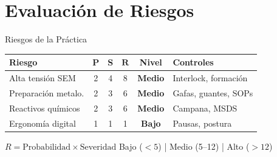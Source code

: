 \documentclass[aspectratio=169,12pt]{beamer}
\begin{document}
\section{Evaluación de Riesgos}

\begin{frame}{Riesgos de la Práctica}
	\centering\small
	\begin{tabular}{>{\raggedright\arraybackslash}p{3.2cm}
		c c c c l}
		\toprule
		\textbf{Riesgo} & \textbf{P}                             & \textbf{S}
		                & $\boldsymbol{R}$                       & \textbf{Nivel}
		                & \textbf{Controles}                                          \\
		\midrule
		\rowcolor{aeroyellow!15}
		Alta tensión SEM
		                & 2                                      & 4              & 8
		                & \textcolor{aeroyellow}{\textbf{Medio}}
		                & Interlock, formación                                        \\
		\rowcolor{aeroyellow!15}
		Preparación metalo.
		                & 2                                      & 3              & 6
		                & \textcolor{aeroyellow}{\textbf{Medio}}
		                & Gafas, guantes, SOPs                                        \\
		\rowcolor{aeroyellow!15}
		Reactivos químicos
		                & 2                                      & 3              & 6
		                & \textcolor{aeroyellow}{\textbf{Medio}}
		                & Campana, MSDS                                               \\
		\rowcolor{aerogreen!15}
		Ergonomía digital
		                & 1                                      & 1              & 1
		                & \textcolor{aerogreen}{\textbf{Bajo}}
		                & Pausas, postura                                             \\
		\bottomrule
	\end{tabular}

	\vspace{0.4em}
	\begin{block}{$R = \text{Probabilidad} \times \text{Severidad}$}
		Bajo ($<5$) \quad | \quad Medio (5--12)
		\quad | \quad Alto ($>12$)
	\end{block}
\end{frame}
\end{document}

